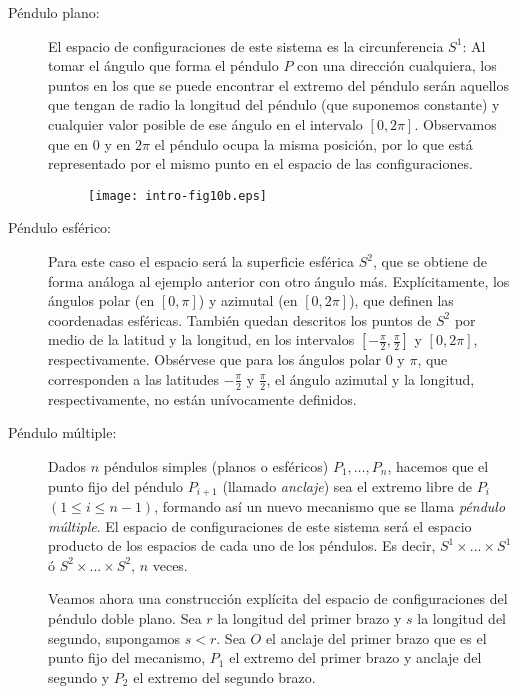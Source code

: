 \documentclass[../VD.tex]{subfiles}
\begin{document}
\begin{description}
	
\item[Péndulo plano:] El espacio de configuraciones de este sistema es la
  circunferencia $S^{1}$: Al tomar el ángulo que forma el péndulo $P$ con una
  dirección cualquiera, los puntos en los que se puede encontrar el extremo del
  péndulo serán aquellos que tengan de radio la longitud del péndulo (que
  suponemos constante) y cualquier valor posible de ese ángulo en el intervalo
  $[0,2\pi]$. Observamos que en $0$ y en $2\pi$ el péndulo ocupa la misma
  posición, por lo que está representado por el mismo punto en el espacio de las
  configuraciones.

  \begin{figure}[ht]
    \centering
    \texttt{[image: intro-fig10b.eps]} %
    \caption{}
    \label{fig10b}
  \end{figure}
  
\item[Péndulo esférico:] Para este caso el espacio será la superficie esférica
  $S^{2}$, que se obtiene de forma análoga al ejemplo anterior con otro ángulo
  más. Explícitamente, los ángulos polar (en $[0,\pi]$) y azimutal (en
  $[0,2\pi]$), que definen las coordenadas esféricas.
  También quedan descritos los puntos de $S^{2}$ por medio de la latitud y la
  longitud, en los intervalos $[-\frac{\pi}{2},\frac{\pi}{2}]$ y $[0,2\pi]$,
  respectivamente. Obsérvese que para los ángulos polar $0$ y $\pi$, que
  corresponden a las latitudes $-\frac{\pi}{2}$ y $\frac{\pi}{2}$, el ángulo
  azimutal y la longitud, respectivamente, no están unívocamente definidos.

\item[Péndulo múltiple:] Dados $n$ péndulos simples (planos o esféricos)
  $P_1,\dots,P_n$, hacemos que el punto fijo del péndulo $P_{i+1}$ (llamado
  \emph{anclaje}) sea el extremo libre de $P_i$ $(1\leq i \leq n-1)$, formando
  así un nuevo mecanismo que se llama \emph{péndulo múltiple}. El espacio de
  configuraciones de este sistema será el espacio producto de los espacios de
  cada uno de los péndulos. Es decir, $S^1\times ... \times S^1$ ó $S^2 \times
  ... \times S^2$, $n$ veces.
  
  Veamos ahora una construcción explícita del espacio de configuraciones del
  péndulo doble plano. Sea $r$ la longitud del primer brazo y $s$ la longitud
  del segundo, supongamos $s<r$. Sea $O$ el anclaje del primer brazo que es el
  punto fijo del mecanismo, $P_1$ el extremo del primer brazo y anclaje del
  segundo y $P_2$ el extremo del segundo brazo.
  

\end{description}
\end{document}
